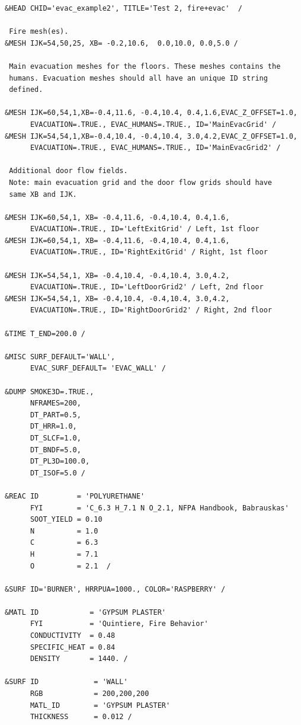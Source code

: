 \documentclass[12pt,a4paper,final,twoside]{stylevk}
\begin{document}
{\fontsize{10}{13}
\selectfont
\begin{verbatim}
&HEAD CHID='evac_example2', TITLE='Test 2, fire+evac'  / 

 Fire mesh(es).
&MESH IJK=54,50,25, XB= -0.2,10.6,  0.0,10.0, 0.0,5.0 /

 Main evacuation meshes for the floors. These meshes contains the
 humans. Evacuation meshes should all have an unique ID string 
 defined.

&MESH IJK=60,54,1,XB=-0.4,11.6, -0.4,10.4, 0.4,1.6,EVAC_Z_OFFSET=1.0,
      EVACUATION=.TRUE., EVAC_HUMANS=.TRUE., ID='MainEvacGrid' /
&MESH IJK=54,54,1,XB=-0.4,10.4, -0.4,10.4, 3.0,4.2,EVAC_Z_OFFSET=1.0,
      EVACUATION=.TRUE., EVAC_HUMANS=.TRUE., ID='MainEvacGrid2' /

 Additional door flow fields.
 Note: main evacuation grid and the door flow grids should have
 same XB and IJK.

&MESH IJK=60,54,1, XB= -0.4,11.6, -0.4,10.4, 0.4,1.6,
      EVACUATION=.TRUE., ID='LeftExitGrid' / Left, 1st floor
&MESH IJK=60,54,1, XB= -0.4,11.6, -0.4,10.4, 0.4,1.6, 
      EVACUATION=.TRUE., ID='RightExitGrid' / Right, 1st floor

&MESH IJK=54,54,1, XB= -0.4,10.4, -0.4,10.4, 3.0,4.2,
      EVACUATION=.TRUE., ID='LeftDoorGrid2' / Left, 2nd floor
&MESH IJK=54,54,1, XB= -0.4,10.4, -0.4,10.4, 3.0,4.2, 
      EVACUATION=.TRUE., ID='RightDoorGrid2' / Right, 2nd floor

&TIME T_END=200.0 / 

&MISC SURF_DEFAULT='WALL',
      EVAC_SURF_DEFAULT= 'EVAC_WALL' / 

&DUMP SMOKE3D=.TRUE.,
      NFRAMES=200,
      DT_PART=0.5,
      DT_HRR=1.0,
      DT_SLCF=1.0,
      DT_BNDF=5.0,
      DT_PL3D=100.0,
      DT_ISOF=5.0 /

&REAC ID         = 'POLYURETHANE'
      FYI        = 'C_6.3 H_7.1 N O_2.1, NFPA Handbook, Babrauskas'
      SOOT_YIELD = 0.10
      N          = 1.0
      C          = 6.3
      H          = 7.1
      O          = 2.1  /

&SURF ID='BURNER', HRRPUA=1000., COLOR='RASPBERRY' /

&MATL ID            = 'GYPSUM PLASTER'
      FYI           = 'Quintiere, Fire Behavior'
      CONDUCTIVITY  = 0.48
      SPECIFIC_HEAT = 0.84
      DENSITY       = 1440. /

&SURF ID             = 'WALL'
      RGB            = 200,200,200
      MATL_ID        = 'GYPSUM PLASTER'
      THICKNESS      = 0.012 /


\end{verbatim}}
\end{document}
